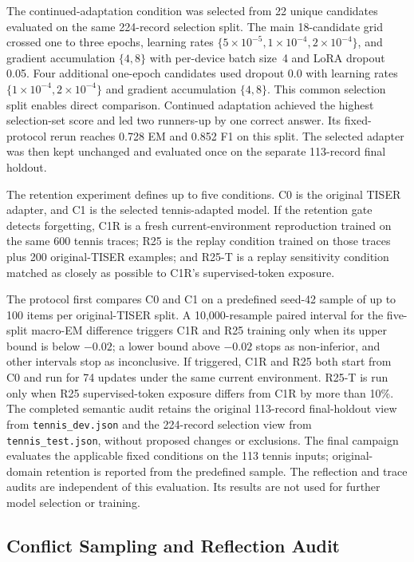 \documentclass[conference]{IEEEtran}
\begin{document}
The continued-adaptation condition was selected from 22 unique candidates evaluated on the same 224-record selection split. The main 18-candidate grid crossed one to three epochs, learning rates $\{5{\times}10^{-5},1{\times}10^{-4},2{\times}10^{-4}\}$, and gradient accumulation $\{4,8\}$ with per-device batch size~4 and LoRA dropout 0.05. Four additional one-epoch candidates used dropout 0.0 with learning rates $\{1{\times}10^{-4},2{\times}10^{-4}\}$ and gradient accumulation $\{4,8\}$. This common selection split enables direct comparison. Continued adaptation achieved the highest selection-set score and led two runners-up by one correct answer. Its fixed-protocol rerun reaches 0.728 EM and 0.852 F1 on this split. The selected adapter was then kept unchanged and evaluated once on the separate 113-record final holdout.

The retention experiment defines up to five conditions. C0 is the original TISER adapter, and C1 is the selected tennis-adapted model. If the retention gate detects forgetting, C1R is a fresh current-environment reproduction trained on the same 600 tennis traces; R25 is the replay condition trained on those traces plus 200 original-TISER examples; and R25-T is a replay sensitivity condition matched as closely as possible to C1R's supervised-token exposure.

The protocol first compares C0 and C1 on a predefined seed-42 sample of up to 100 items per original-TISER split. A 10,000-resample paired interval for the five-split macro-EM difference triggers C1R and R25 training only when its upper bound is below $-0.02$; a lower bound above $-0.02$ stops as non-inferior, and other intervals stop as inconclusive. If triggered, C1R and R25 both start from C0 and run for 74 updates under the same current environment. R25-T is run only when R25 supervised-token exposure differs from C1R by more than 10\%. The completed semantic audit retains the original 113-record final-holdout view from \texttt{tennis\_dev.json} and the 224-record selection view from \texttt{tennis\_test.json}, without proposed changes or exclusions. The final campaign evaluates the applicable fixed conditions on the 113 tennis inputs; original-domain retention is reported from the predefined sample. The reflection and trace audits are independent of this evaluation. Its results are not used for further model selection or training.

\subsection{Conflict Sampling and Reflection Audit}
\end{document}
